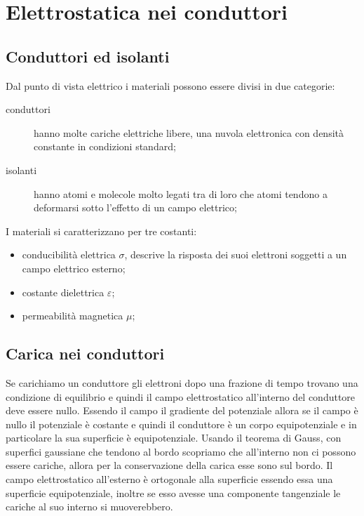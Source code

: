 \chapter{Elettrostatica nei conduttori}
\minitoc
\section{Conduttori ed isolanti}
Dal punto di vista elettrico i materiali possono essere divisi in due categorie:
\begin{description}
\item[conduttori] hanno molte cariche elettriche libere, una nuvola elettronica con densità constante in condizioni standard;
\item[isolanti] hanno atomi e molecole molto legati tra di loro che atomi tendono a deformarsi sotto l'effetto di un campo elettrico;
\end{description}
I materiali si caratterizzano per tre costanti:
\begin{itemize}
\item conducibilità elettrica $\sigma$, descrive la risposta dei suoi elettroni soggetti a un campo elettrico esterno;
\item costante dielettrica $\varepsilon$;
\item permeabilità magnetica $\mu$;
\end{itemize}

\section{Carica nei conduttori}
Se carichiamo un conduttore gli elettroni dopo una frazione di tempo trovano una condizione di equilibrio e quindi il campo elettrostatico all'interno del conduttore deve essere nullo. Essendo il campo il gradiente del potenziale allora se il campo è nullo il potenziale è costante e quindi il conduttore è un corpo equipotenziale e in particolare la sua superficie è equipotenziale. Usando il teorema di Gauss, con superfici gaussiane che tendono al bordo scopriamo che all'interno non ci possono essere cariche, allora per la conservazione della carica esse sono sul bordo. Il campo elettrostatico all'esterno è ortogonale alla superficie essendo essa una superficie equipotenziale, inoltre se esso avesse una componente tangenziale le cariche al suo interno si muoverebbero.
